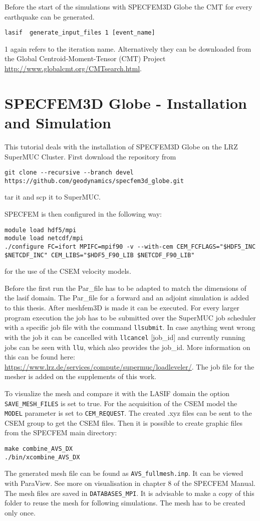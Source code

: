 Before the start of the simulations with SPECFEM3D Globe the CMT for every earthquake can be generated.
\begin{lstlisting} 
lasif  generate_input_files 1 [event_name]
\end{lstlisting}
1 again refers to the iteration name. 
Alternatively they can be downloaded from the Global Centroid-Moment-Tensor (CMT) Project
\url{http://www.globalcmt.org/CMTsearch.html}.


\section{SPECFEM3D Globe - Installation and Simulation}

This tutorial deals with the installation of SPECFEM3D Globe on the 
LRZ SuperMUC Cluster. 
First download the repository from
\begin{lstlisting} 
git clone --recursive --branch devel https://github.com/geodynamics/specfem3d_globe.git
\end{lstlisting}
tar it and scp it to SuperMUC.

SPECFEM is then configured in the following way:
\begin{lstlisting} 
module load hdf5/mpi
module load netcdf/mpi
./configure FC=ifort MPIFC=mpif90 -v --with-cem CEM_FCFLAGS="$HDF5_INC  $NETCDF_INC" CEM_LIBS="$HDF5_F90_LIB $NETCDF_F90_LIB"
\end{lstlisting}
for the use of the CSEM velocity models.

Before the first run the Par\_file has to be adapted  to match the 
dimensions of the lasif domain. 
The Par\_file for a forward and an adjoint simulation is added to this thesis.
After meshfem3D is made it can be executed. 
For every larger program execution the job has to be submitted over the SuperMUC
job scheduler with a specific job file with the command \texttt{llsubmit}.
In case anything went wrong with the job it can be cancelled with 
\texttt{llcancel} [job\_id] and currently running jobs can be seen with \texttt{llu}, which also provides the job\_id.
More information on this can be found here: \url{https://www.lrz.de/services/compute/supermuc/loadleveler/}.
The job file for the mesher is added on the supplements of this work.

To visualize the mesh and compare it with the LASIF domain the option 
\texttt{SAVE\_MESH\_FILES} is set to true. 
For the acquisition of the CSEM model the \texttt{MODEL} parameter is set
to \texttt{CEM\_REQUEST}. 
The created .xyz files can be sent to the CSEM group to get the CSEM files.
Then it is possible to create graphic files from the SPECFEM main directory:
\begin{lstlisting} 
make combine_AVS_DX
./bin/xcombine_AVS_DX
\end{lstlisting}
The generated mesh file can be found as \texttt{AVS\_fullmesh.inp}.
It can be viewed with ParaView.
See more on visualisation in chapter 8 of the SPECFEM Manual.
The mesh files are saved in \texttt{DATABASES\_MPI}. 
It is advisable to make a copy of this folder to reuse the mesh
for following simulations. 
The mesh has to be created only once.

